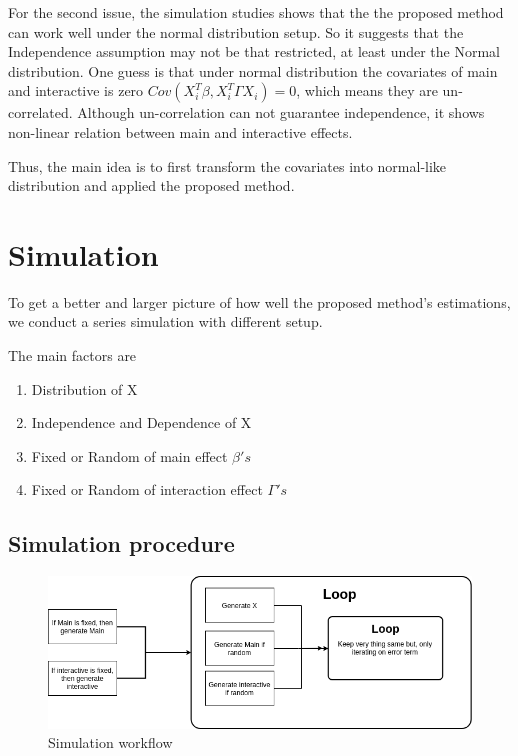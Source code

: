 \documentclass[]{article}
\providecommand{\tightlist}{%
  \setlength{\itemsep}{0pt}\setlength{\parskip}{0pt}}
\begin{document}
For the second issue, the simulation studies shows that the the proposed
method can work well under the normal distribution setup. So it suggests
that the Independence assumption may not be that restricted, at least
under the Normal distribution. One guess is that under normal
distribution the covariates of main and interactive is zero
\(Cov(X_i^T\beta, X_i^T\Gamma X_i) = 0\), which means they are
un-correlated. Although un-correlation can not guarantee independence,
it shows non-linear relation between main and interactive effects.

Thus, the main idea is to first transform the covariates into
normal-like distribution and applied the proposed method.

\section{Simulation}\label{simulation}

To get a better and larger picture of how well the proposed method's
estimations, we conduct a series simulation with different setup.

The main factors are

\begin{enumerate}
\def\labelenumi{\arabic{enumi}.}
\tightlist
\item
  Distribution of X\\
\item
  Independence and Dependence of X\\
\item
  Fixed or Random of main effect \(\beta's\)\\
\item
  Fixed or Random of interaction effect \(\Gamma's\)
\end{enumerate}

\subsection{Simulation procedure}\label{simulation-procedure}

\begin{figure}
\centering
\includegraphics{./simulation_workflow.png}
\caption{Simulation workflow}
\end{figure}
\end{document}
